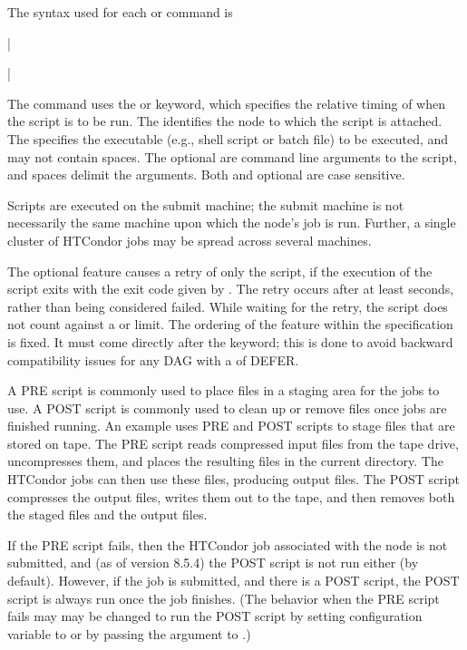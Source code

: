 The syntax used for each  or  command is

 
 | 

 
  | 

The  command uses
the  or  keyword,
which specifies the relative timing of when the script is to be run.
The  identifies the node to which the script is attached.
The 
specifies the executable (e.g., shell script or batch file) to be executed, 
and may not contain spaces.
The optional  are command line arguments to the script,
and spaces delimit the arguments.
Both  and optional  are
case sensitive.

Scripts are executed on the submit machine;
the submit machine is not necessarily
the same machine upon which the node's job is run.
Further, a single cluster of HTCondor jobs may be
spread across several machines.

The optional  feature causes a retry of only the script,
if the execution of the script exits with the
exit code given by .
The retry occurs after at least  seconds, 
rather than being considered failed.  
While waiting for the retry,
the script does not count against a  or  limit.
The ordering of the  feature within the  
specification is fixed.
It must come directly after the  keyword;
this is done to avoid backward compatibility issues for any
DAG with a  of DEFER.

A PRE script is commonly used
to place files in a staging area for the jobs to use.
A POST script is commonly used
to clean up or remove files once jobs are finished running.
An example uses PRE and POST scripts to stage files
that are stored on tape.
The PRE script reads compressed input files from the tape drive,
uncompresses them, and places the resulting files in the current directory.
The HTCondor jobs can then use these files,
producing output files.
The POST script compresses the output files, writes them out to
the tape, and then removes both the staged files and the output files.

If the PRE script fails, 
then the HTCondor job associated with the node is not submitted,
and (as of version 8.5.4) the POST
script is not run either (by default).
However, if the job is submitted, and there is a POST script, the POST
script is always run once the job finishes.
(The behavior when the PRE script fails may
may be changed to run the POST script
by setting configuration variable  
to  or by passing the 
argument to .)


